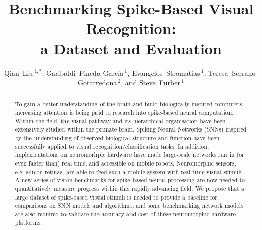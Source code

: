 \documentclass[pdftex]{bioinfo}
\def\firstAuthorLast{Qian Liu {et~al.}} %
\def\Authors{Qian~Liu\,$^{1,*}$, Garibaldi~Pineda-Garc\'ia\,$^{1}$, Evangelos~Stromatias\,$^{1}$, Teresa~Serrano-Gotarredona\,$^{2}$, and Steve~Furber\,$^{1}$}
\def\Address{$^{1}$Advanced Processor Technologies Research Group, School of Computer Science, University of Manchester, Manchester, United Kingdom\\
$^{2}$Instituto de Microelectrónica de Sevilla (IMSE-
CNM-CSIC), Sevilla, Spain }
\begin{document}

\title[Benchmarking Spike-Based Visual Recognition: a Dataset and Evaluation]{Benchmarking  Spike-Based Visual Recognition:\\ a Dataset and Evaluation}
\author[\firstAuthorLast ]{\Authors}
\address{\Address}
\history{}

\editor{}


\maketitle
\begin{abstract}
To gain a better understanding of the brain and build biologically-inspired computers, increasing attention is being paid to research into spike-based neural computation.
Within the field, the visual pathway and its hierarchical organisation have been extensively studied within the primate brain.
Spiking Neural Networks (SNNs) inspired by the understanding of observed biological structure and function have been successfully applied to visual recognition/classification tasks.
In addition, implementations on neuromorhpic hardware have made large-scale networks run in (or even faster than) real time, and accessible on mobile robots.
Neuromorphic sensors, e.g. silicon retinas, are able to feed such a mobile system with real-time visual stimuli.
A new series of vision benchmarks for spike-based neural processing are now needed to quantitatively measure progress within this rapidly advancing field.
We propose that a large dataset of spike-based visual stimuli is needed to provide a baseline for comparisons on SNN models and algorithms, and some benchmarking network models are also required to validate the accuracy and cost of these neuromorphic hardware platforms.


\end{abstract}
\end{document}

